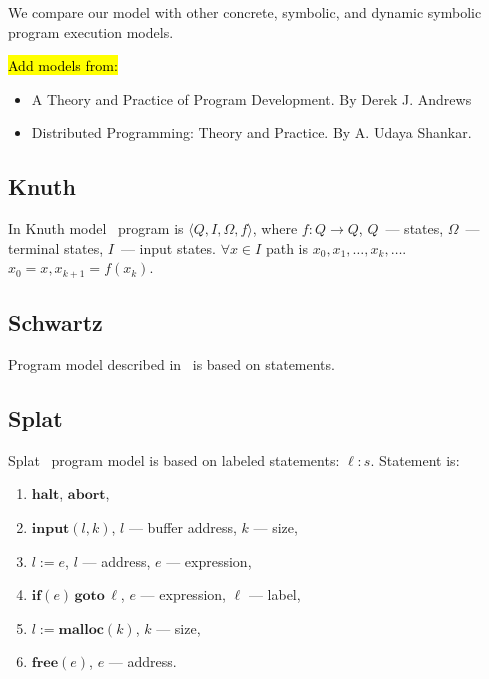 \documentclass[oneside,a4]{article}  %
\newcommand{\sublevel}{\subsection}
\newcommand{\comment}[1]{\hl{#1}}
\newcommand{\ra}{\rightarrow}
\begin{document}
We compare our model with other concrete, symbolic, and dynamic symbolic
program execution models.

 \comment{Add models from:}
\begin{itemize}
    \item A Theory and Practice of Program Development.
        By Derek J. Andrews
    \item Distributed Programming: Theory and Practice.
        By A. Udaya Shankar.
\end{itemize}

\sublevel{Knuth}

In Knuth model~\cite{knuth} program is $\langle Q, I, \Omega, f \rangle$,
where $f: Q \ra Q$, $Q$~--- states, $\Omega$~--- terminal states,
$I$~--- input states.
$\forall x \in I$ path is $x_0, x_1, \dots, x_k, \dots$.
$x_0 = x, x_{k + 1} = f(x_k)$.

\sublevel{Schwartz}

Program model described in~\cite{dta_fse} is based on statements.

\sublevel{Splat}

Splat~\cite{splat} program model is based on labeled statements: $\ell: s$.
Statement is:
\begin{enumerate}[itemsep=-0.5ex]
    \item $\textbf{halt}$, $\textbf{abort}$,
    \item $\textbf{input}(l, k)$, $l$ --- buffer address, $k$ --- size,
    \item $l := e$, $l$ --- address, $e$ --- expression,
    \item $\textbf{if}(e)\,\textbf{goto}\, \ell$, $e$ --- expression,
        $\ell$ --- label,
    \item $l := \textbf{malloc}(k)$, $k$ --- size,
    \item $\textbf{free}(e)$, $e$ --- address.
\end{enumerate}

\setlength{\parskip}{0em}
\pagebreak
\tableofcontents
\pagebreak
\setlength{\parskip}{0.5em}

\printindex

{}

\end{document}
